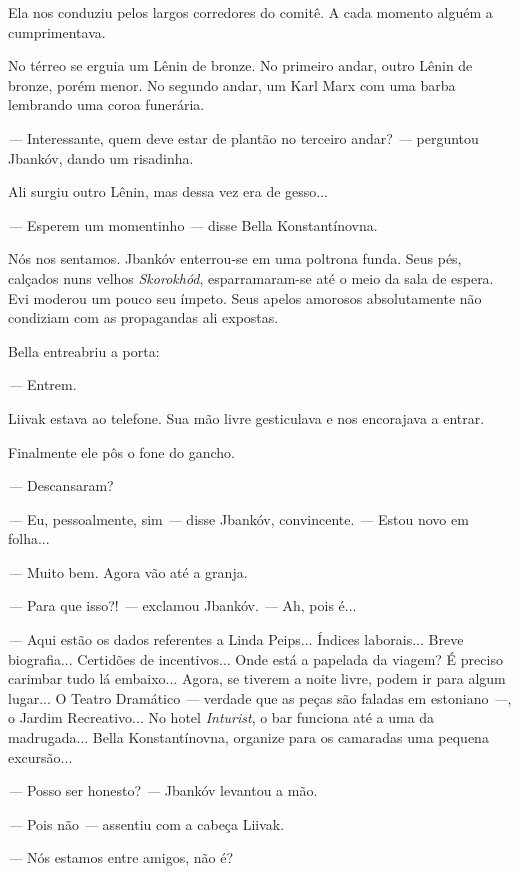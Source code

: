 Ela nos conduziu pelos largos corredores do comitê. A cada momento
alguém a cumprimentava.

No térreo se erguia um Lênin de bronze. No primeiro andar, outro Lênin
de bronze, porém menor. No segundo andar, um Karl Marx com uma barba
lembrando uma coroa funerária.

\emph{---} Interessante, quem deve estar de plantão no terceiro andar?
\emph{---} perguntou Jbankóv, dando um risadinha.

Ali surgiu outro Lênin, mas dessa vez era de gesso...

\emph{---} Esperem um momentinho \emph{---} disse Bella Konstantínovna.

Nós nos sentamos. Jbankóv enterrou-se em uma poltrona funda. Seus pés,
calçados nuns velhos \emph{Skorokhód}, esparramaram-se até o meio da
sala de espera. Evi moderou um pouco seu ímpeto. Seus apelos amorosos
absolutamente não condiziam com as propagandas ali expostas.

Bella entreabriu a porta:

\emph{---} Entrem.

Liivak estava ao telefone. Sua mão livre gesticulava e nos encorajava a
entrar.

Finalmente ele pôs o fone do gancho.

\emph{---} Descansaram?

\emph{---} Eu, pessoalmente, sim \emph{---} disse Jbankóv, convincente.
\emph{---} Estou novo em folha...

\emph{---} Muito bem. Agora vão até a granja.

\emph{---} Para que isso?! \emph{---} exclamou Jbankóv. \emph{---} Ah,
pois é...

\emph{---} Aqui estão os dados referentes a Linda Peips... Índices
laborais... Breve biografia... Certidões de incentivos... Onde está a
papelada da viagem? É preciso carimbar tudo lá embaixo... Agora, se
tiverem a noite livre, podem ir para algum lugar... O Teatro Dramático
\emph{---} verdade que as peças são faladas em estoniano \emph{---}, o
Jardim Recreativo... No hotel \emph{Inturist}, o bar funciona até a uma
da madrugada... Bella Konstantínovna, organize para os camaradas uma
pequena excursão...

\emph{---} Posso ser honesto? \emph{---} Jbankóv levantou a mão.

\emph{---} Pois não \emph{---} assentiu com a cabeça Liivak.

\emph{---} Nós estamos entre amigos, não é?

